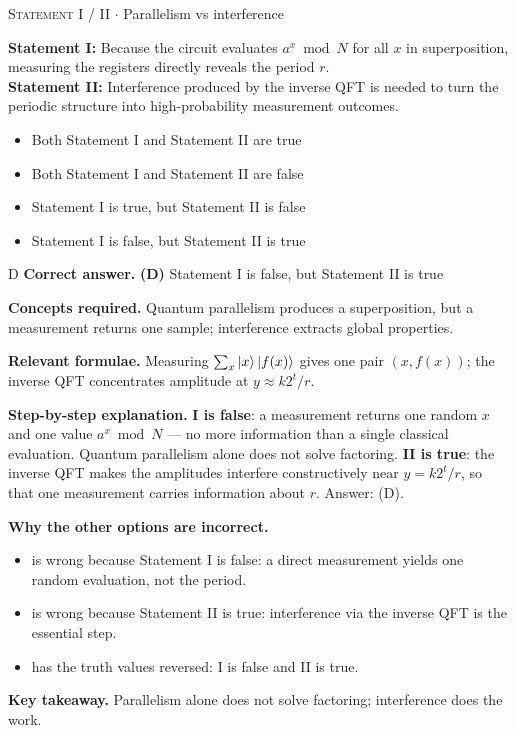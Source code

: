 \documentclass[11pt,a4paper]{article}
\newcommand{\optlabel}[1]{\textbf{(#1)}}
\newcommand{\correctlabel}[1]{\textcolor{okgreen}{\textbf{(#1)}\,\ding{51}}}
\newenvironment{qitem}[1]{\begin{list}{}{\setlength{\leftmargin}{3.3em}\setlength{\labelwidth}{3.1em}%
  \setlength{\labelsep}{0.2em}\setlength{\topsep}{3pt}\setlength{\parsep}{3pt}}\item[\textbf{Q.#1}\hfill]}{\end{list}}
\newcommand{\qsep}{\par\vspace{2pt}{\color{black!15}\hrule}\vspace{4pt}}
\newcommand{\qmeta}[2]{{\footnotesize\color{black!60}\textsc{#1} \;$\cdot$\; #2}\par}
\begin{document}
\begin{qitem}{38}
\qmeta{Statement I / II}{Parallelism vs interference}
\textbf{Statement I:} Because the circuit evaluates $a^x \bmod N$ for all $x$ in superposition, measuring the registers directly reveals the period $r$.\\[1mm]
\textbf{Statement II:} Interference produced by the inverse QFT is needed to turn the periodic structure into high-probability measurement outcomes.
\begin{itemize}[leftmargin=2.6em, labelsep=0.4em, itemsep=2pt, topsep=3pt]
\item[\optlabel{A}] Both Statement I and Statement II are true
\item[\optlabel{B}] Both Statement I and Statement II are false
\item[\optlabel{C}] Statement I is true, but Statement II is false
\item[\correctlabel{D}] Statement I is false, but Statement II is true
\end{itemize}
\end{qitem}
\begin{solbox}{D}
\textbf{\color{brand}Correct answer.} \textcolor{okgreen}{\textbf{(D)}} Statement I is false, but Statement II is true

\textbf{\color{brand}Concepts required.} Quantum parallelism produces a superposition, but a measurement returns one sample; interference extracts global properties.

\textbf{\color{brand}Relevant formulae.} Measuring $\sum_x\ket x\ket{f(x)}$ gives one pair $(x, f(x))$; the inverse QFT concentrates amplitude at $y \approx k2^t/r$.

\textbf{\color{brand}Step-by-step explanation.} \textbf{I is false}: a measurement returns one random $x$ and one value $a^x \bmod N$ --- no more information than a single classical evaluation. Quantum
parallelism alone does not solve factoring. \textbf{II is true}: the inverse QFT makes the amplitudes interfere constructively near $y = k2^t/r$, so that one
measurement carries information about $r$. Answer: (D).

\textbf{\color{brand}Why the other options are incorrect.}
\begin{itemize}[leftmargin=2.4em, itemsep=1pt, topsep=2pt]
\item[\textbf{(A)}] is wrong because Statement I is false: a direct measurement yields one random evaluation, not the period.
\item[\textbf{(B)}] is wrong because Statement II is true: interference via the inverse QFT is the essential step.
\item[\textbf{(C)}] has the truth values reversed: I is false and II is true.
\end{itemize}
\textbf{\color{brand}Key takeaway.} Parallelism alone does not solve factoring; interference does the work.
\end{solbox}
\qsep
\end{document}

